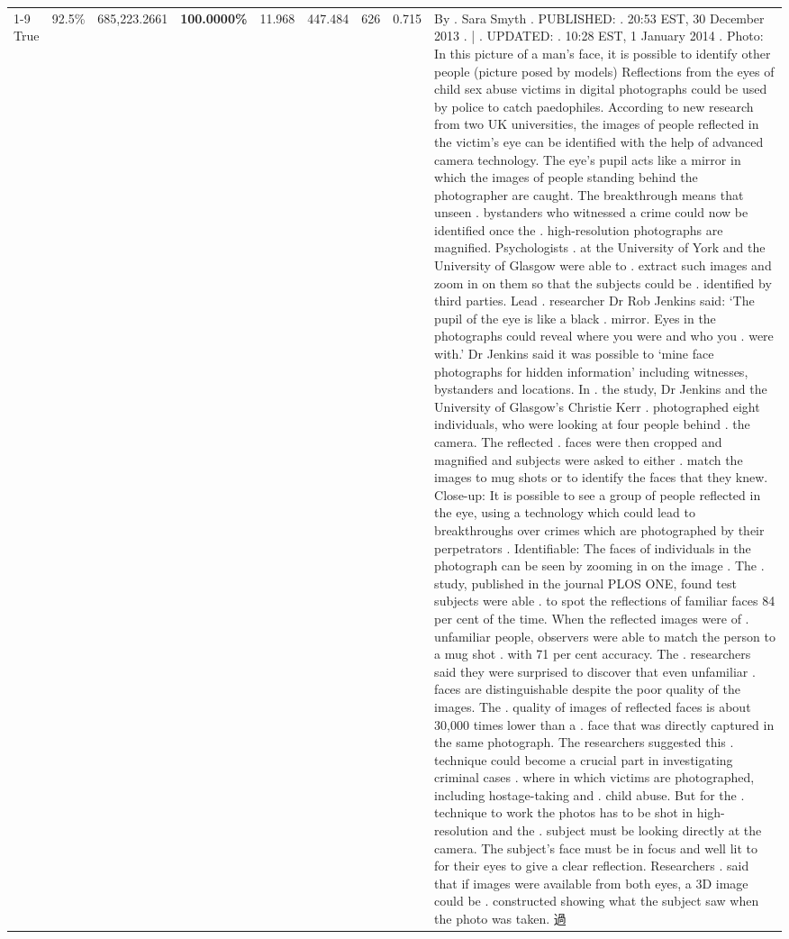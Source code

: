 \begin{table}[H]
\begin{tabular}{lllrlllll}
\cline{1-9}
True & 92.5\% & 685,223.2661 & \bfseries \color{red} 100.0000\% & 11.968 & 447.484 & 626 & 0.715 & By . Sara Smyth . PUBLISHED: . 20:53 EST, 30 December 2013 . | . UPDATED: . 10:28 EST, 1 January 2014 . Photo: In this picture of a man's face, it is possible to identify other people (picture posed by models) Reflections from the eyes of child sex abuse victims in digital photographs could be used by police to catch paedophiles. According to new research from two UK universities, the images of people reflected in the victim's eye can be identified with the help of advanced camera technology. The eye's pupil acts like a mirror in which the images of people standing behind the photographer are caught. The breakthrough means that unseen . bystanders who witnessed a crime could now be identified once the . high-resolution photographs are magnified. Psychologists . at the University of York and the University of Glasgow were able to . extract such images and zoom in on them so that the subjects could be . identified by third parties. Lead . researcher Dr Rob Jenkins said: ‘The pupil of the eye is like a black . mirror. Eyes in the photographs could reveal where you were and who you . were with.' Dr Jenkins said it was possible to ‘mine face photographs for hidden information' including witnesses, bystanders and locations. In . the study, Dr Jenkins and the University of Glasgow's Christie Kerr . photographed eight individuals, who were looking at four people behind . the camera. The reflected . faces were then cropped and magnified and subjects were asked to either . match the images to mug shots or to identify the faces that they knew. Close-up: It is possible to see a group of people reflected in the eye, using a technology which could lead to breakthroughs over crimes which are photographed by their perpetrators . Identifiable: The faces of individuals in the photograph can be seen by zooming in on the image . The . study, published in the journal PLOS ONE, found test subjects were able . to spot the reflections of familiar faces 84 per cent of the time. When the reflected images were of . unfamiliar people, observers were able to match the person to a mug shot . with 71 per cent accuracy. The . researchers said they were surprised to discover that even unfamiliar . faces are distinguishable despite the poor quality of the images. The . quality of images of reflected faces is about 30,000 times lower than a . face that was directly captured in the same photograph. The researchers suggested this . technique could become a crucial part in investigating criminal cases . where in which victims are photographed, including hostage-taking and . child abuse. But for the . technique to work the photos has to be shot in high-resolution and the . subject must be looking directly at the camera. The subject's face must be in focus and well lit to for their eyes to give a clear reflection. Researchers . said that if images were available from both eyes, a 3D image could be . constructed showing what the subject saw when the photo was taken. 過 \\

\end{tabular}
\end{table}

